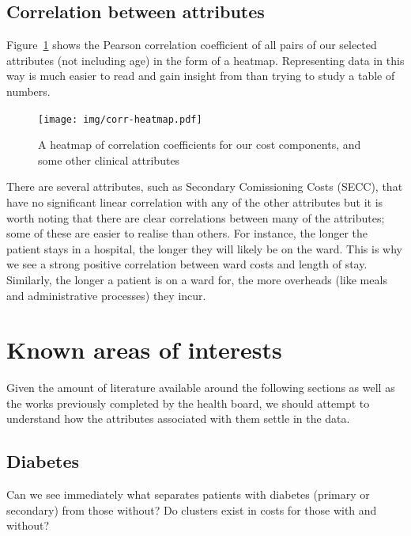 \documentclass{article}
\begin{document}
\subsection{Correlation between attributes}\label{subsec:corr-cov}

Figure~\ref{fig:corr-heatmap} shows the Pearson correlation coefficient of all 
pairs of our selected attributes (not including age) in the form of a heatmap.
Representing data in this way is much easier to read and gain insight from than
trying to study a table of numbers.

\begin{figure}[h]
    \centering
    \texttt{[image: img/corr-heatmap.pdf]}
    \caption{A heatmap of correlation coefficients for our cost components, and
        some other clinical attributes}
    \label{fig:corr-heatmap}
\end{figure}

There are several attributes, such as Secondary Comissioning Costs (SECC), that 
have no significant linear correlation with any of the other attributes but it 
is worth noting that there are clear correlations between many of the 
attributes; some of these are easier to realise than others. For instance, the 
longer the patient stays in a hospital, the longer they will likely be on the 
ward. This is why we see a strong positive correlation between ward costs and 
length of stay. Similarly, the longer a patient is on a ward for, the more 
overheads (like meals and administrative processes) they incur.

\section{Known areas of interests}\label{sec:known}

Given the amount of literature available around the following sections as well
as the works previously completed by the health board, we should attempt to
understand how the attributes associated with them settle in the data.

\subsection{Diabetes}\label{subsec:diabetes}

Can we see immediately what separates patients with diabetes (primary or
secondary) from those without? Do clusters exist in costs for those with and
without?
\end{document}
